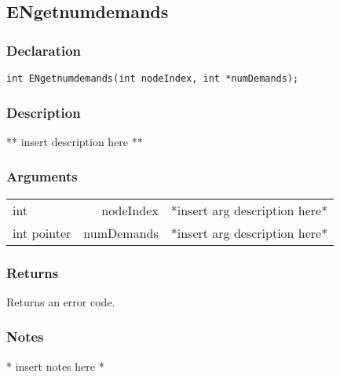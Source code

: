 \subsection{ENgetnumdemands}
\subsubsection{Declaration}
\begin{lstlisting}
int ENgetnumdemands(int nodeIndex, int *numDemands);
\end{lstlisting}
\subsubsection{Description}
** insert description here **
\subsubsection{Arguments}
\begin{tabular}{l r p{11cm} }
int&nodeIndex&*insert arg description here* \\[6pt]
int pointer&numDemands&*insert arg description here* \\[6pt]
\end{tabular}
\subsubsection{Returns}
Returns an error code.
\subsubsection{Notes}
* insert notes here *